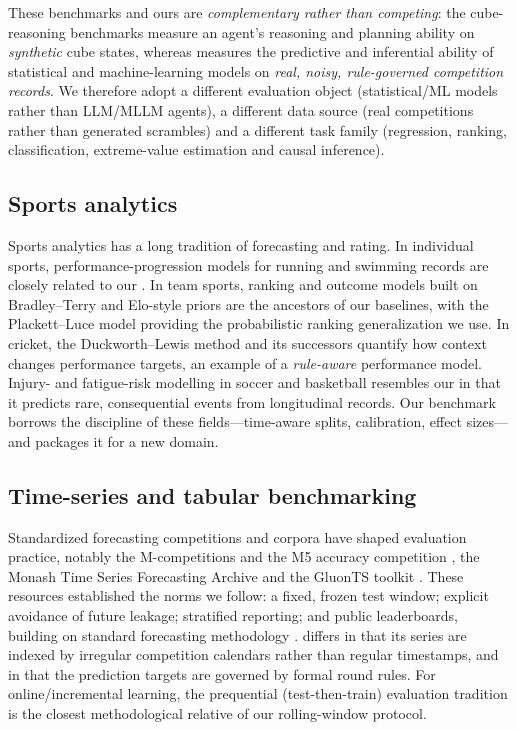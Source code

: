 These benchmarks and ours are \emph{complementary rather than competing}: the
cube-reasoning benchmarks measure an agent's reasoning and planning ability on
\emph{synthetic} cube states, whereas \wcabench{} measures the predictive and
inferential ability of statistical and machine-learning models on \emph{real,
noisy, rule-governed competition records}. We therefore adopt a different
evaluation object (statistical/ML models rather than LLM/MLLM agents), a
different data source (real competitions rather than generated scrambles) and a
different task family (regression, ranking, classification, extreme-value
estimation and causal inference).

\subsection{Sports analytics}
\label{sec:related-sports}

Sports analytics has a long tradition of forecasting and rating. In
individual sports, performance-progression models for running and swimming
records are closely related to our  \citep{tatem_sprint,
nevill_running}. In team sports, ranking and outcome models built on
Bradley--Terry and Elo-style priors \citep{bradley_terry, elo} are the
ancestors of our  baselines, with the Plackett--Luce model
\citep{plackett_luce} providing the probabilistic ranking generalization we
use. In cricket, the Duckworth--Lewis method and its successors quantify how
context changes performance targets, an example of a \emph{rule-aware}
performance model. Injury- and fatigue-risk modelling in soccer and basketball
\citep{injury_prediction} resembles our  in that it predicts rare,
consequential events from longitudinal records. Our benchmark borrows the
discipline of these fields---time-aware splits, calibration, effect sizes---and
packages it for a new domain.

\subsection{Time-series and tabular benchmarking}
\label{sec:related-ts}

Standardized forecasting competitions and corpora have shaped evaluation
practice, notably the M-competitions and the M5 accuracy competition
\citep{m5_competition}, the Monash Time Series Forecasting Archive
\citep{monash_tsf} and the GluonTS toolkit \citep{gluonts}. These resources
established the norms we follow: a fixed, frozen test window; explicit
avoidance of future leakage; stratified reporting; and public leaderboards,
building on standard forecasting methodology \citep{hyndman_fpp3}.
\wcabench{} differs in that its series are indexed by irregular competition
calendars rather than regular timestamps, and in that the prediction targets
are governed by formal round rules. For online/incremental learning, the
prequential (test-then-train) evaluation tradition \citep{prequential} is the
closest methodological relative of our rolling-window protocol.

